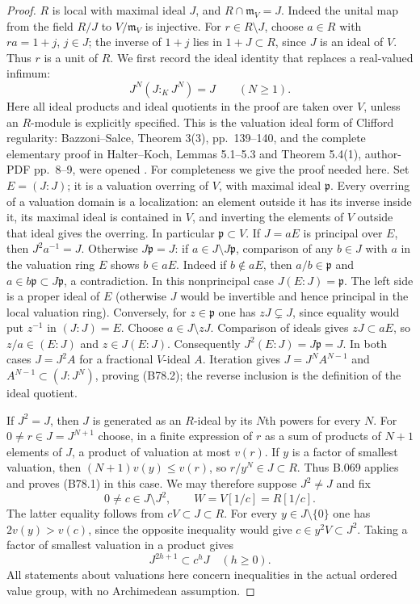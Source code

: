 \begin{proof}
$R$ is local with maximal ideal $J$, and $R\cap\mathfrak m_V=J$.
Indeed the unital map from the field $R/J$ to $V/\mathfrak m_V$ is
injective. For $r\in R\setminus J$, choose $a\in R$ with $ra=1+j$,
$j\in J$; the inverse of $1+j$ lies in $1+J\subset R$, since $J$
is an ideal of $V$. Thus $r$ is a unit of $R$.
We first record the ideal identity that replaces a real-valued infimum:
\[
                 J^N(J:_K J^N)=J\qquad(N\ge1).           \tag{B78.2}
\]
Here all ideal products and ideal quotients in the proof are taken over
$V$, unless an $R$-module is explicitly specified. This is the valuation
ideal form of Clifford regularity: Bazzoni--Salce, Theorem 3(3), pp.~139--140,
and the complete elementary proof in Halter--Koch, Lemmas 5.1--5.3 and
Theorem 5.4(1), author-PDF pp.~8--9, were opened
\cite{BazzoniSalce1996,HalterKoch2009}. For completeness we give the proof
needed here. Set $E=(J:J)$; it is a valuation overring of $V$, with maximal
ideal $\mathfrak p$. Every overring of a valuation domain is a localization:
an element outside it has its inverse inside it, its maximal ideal is
contained in $V$, and inverting the elements of $V$ outside that ideal
gives the overring. In particular $\mathfrak p\subset V$.
If $J=aE$ is principal over $E$, then $J^2a^{-1}=J$.
Otherwise $J\mathfrak p=J$: if $a\in J\setminus J\mathfrak p$, comparison
of any $b\in J$ with $a$ in the valuation ring $E$ shows $b\in aE$.
Indeed if $b\notin aE$, then $a/b\in\mathfrak p$ and
$a\in b\mathfrak p\subset J\mathfrak p$, a contradiction.
In this nonprincipal case $J(E:J)=\mathfrak p$. The left side is a proper
ideal of $E$ (otherwise $J$ would be invertible and hence principal in
the local valuation ring). Conversely, for $z\in\mathfrak p$ one has
$zJ\subsetneq J$, since equality would put $z^{-1}$ in $(J:J)=E$.
Choose $a\in J\setminus zJ$. Comparison of ideals gives $zJ\subset aE$,
so $z/a\in(E:J)$ and $z\in J(E:J)$. Consequently
$J^2(E:J)=J\mathfrak p=J$. In both cases $J=J^2A$ for a fractional
$V$-ideal $A$. Iteration gives $J=J^N A^{N-1}$ and
$A^{N-1}\subset(J:J^N)$, proving (B78.2); the reverse inclusion is
the definition of the ideal quotient.

If $J^2=J$, then $J$ is generated as an $R$-ideal by its $N$th powers
for every $N$. For $0\ne r\in J=J^{N+1}$ choose, in a finite expression
of $r$ as a sum of products of $N+1$ elements of $J$, a product of
valuation at most $v(r)$. If $y$ is a factor of smallest valuation, then
$(N+1)v(y)\le v(r)$, so $r/y^N\in J\subset R$.
Thus B.069 applies and proves (B78.1) in this case.
We may therefore suppose $J^2\ne J$ and fix
\[
             0\ne c\in J\setminus J^2,\qquad W=V[1/c]=R[1/c].
                                                        \tag{B78.3}
\]
The latter equality follows from $cV\subset J\subset R$.
For every $y\in J\setminus\{0\}$ one has $2v(y)>v(c)$, since the
opposite inequality would give $c\in y^2V\subset J^2$.
Taking a factor of smallest valuation in a product gives
\[
                      J^{2h+1}\subset c^hJ\quad(h\ge0). \tag{B78.4}
\]
All statements about valuations here concern inequalities in the actual
ordered value group, with no Archimedean assumption.


\end{proof}
